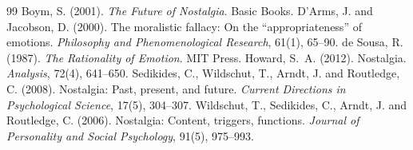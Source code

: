 \documentclass{situationist-preprint}
\begin{document}
\begin{thebibliography}{99}\small
{} Boym, S. (2001). \emph{The Future of Nostalgia}. Basic Books.
 D'Arms, J. and Jacobson, D. (2000). The moralistic fallacy: On the \enquote{appropriateness} of emotions. \emph{Philosophy and Phenomenological Research}, 61(1), 65--90.
 de Sousa, R. (1987). \emph{The Rationality of Emotion}. MIT Press.
 Howard, S.~A. (2012). Nostalgia. \emph{Analysis}, 72(4), 641--650.
 Sedikides, C., Wildschut, T., Arndt, J. and Routledge, C. (2008). Nostalgia: Past, present, and future. \emph{Current Directions in Psychological Science}, 17(5), 304--307.
 Wildschut, T., Sedikides, C., Arndt, J. and Routledge, C. (2006). Nostalgia: Content, triggers, functions. \emph{Journal of Personality and Social Psychology}, 91(5), 975--993.
\end{thebibliography}
\end{document}
